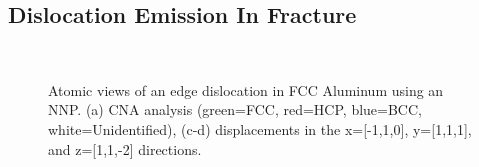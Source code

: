 \documentclass{article}
\begin{document}
\subsection{Dislocation Emission In Fracture} \label{apd_sct:fracturedislocation_images}
\begin{figure}[H]%
\centering%
%
%
\\
%
%
\caption{Atomic views of an edge dislocation in FCC Aluminum using an NNP. (a) CNA analysis (green=FCC, red=HCP, blue=BCC, white=Unidentified), (c-d) displacements in the x=[-1,1,0], y=[1,1,1], and z=[1,1,-2] directions. }
\label{fig:edgedislocation_views}
\end{figure}
\end{document}
